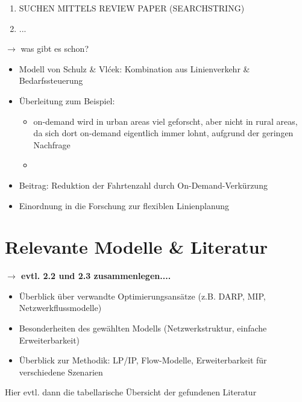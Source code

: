 \begin{enumerate}
    \item SUCHEN MITTELS REVIEW PAPER (SEARCHSTRING)
    \item ...
\end{enumerate}


$\rightarrow$ was gibt es schon?

\begin{itemize}
    \item Modell von Schulz \& Vlćek: Kombination aus Linienverkehr \& Bedarfssteuerung
    \item Überleitung zum Beispiel:
    \begin{itemize}
        \item on-demand wird in urban areas viel geforscht, aber nicht in rural areas, da sich dort on-demand eigentlich immer lohnt, aufgrund der geringen Nachfrage
        \item %
    \end{itemize}
    \item Beitrag: Reduktion der Fahrtenzahl durch On-Demand-Verkürzung
    \item Einordnung in die Forschung zur flexiblen Linienplanung
\end{itemize}
\section{Relevante Modelle \& Literatur}
\textbf{$\rightarrow$ evtl. 2.2 und 2.3 zusammenlegen....}
\begin{itemize}
    \item Überblick über verwandte Optimierungsansätze (z.B. DARP, MIP, Netzwerkflussmodelle)
    \item Besonderheiten des gewählten Modells (Netzwerkstruktur, einfache Erweiterbarkeit)
    \item Überblick zur Methodik: LP/IP, Flow-Modelle, Erweiterbarkeit für verschiedene Szenarien
\end{itemize}

Hier evtl. dann die tabellarische Übersicht der gefundenen Literatur
